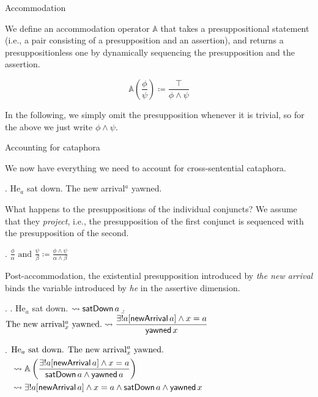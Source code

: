 \documentclass{beamer}
\begin{document}
\begin{frame}{Accommodation}

  We define an accommodation operator \(\mathbb{A}\) that takes a presuppositional statement (i.e., a pair consisting of a presupposition and an assertion), and returns a presuppositionless one by dynamically sequencing the presupposition and the assertion.

  \[\mathbb{A}\left(\frac{\phi}{\psi}\right) \coloneq \displaystyle\frac{\top}{\phi \wedge \psi}\]

  In the following, we simply omit the presupposition whenever it is trivial, so for the above we just write \(\phi \wedge \psi\).

\end{frame}

\begin{frame}[allowframebreaks]{Accounting for cataphora}

  We now have everything we need to account for cross-sentential cataphora.

  \ex. He\(_{a}\) sat down. The new arrival\(^{a}\) yawned.

 What happens to the presuppositions of the individual conjuncts? We assume that they \textit{project}, i.e., the presupposition of the first conjunct is sequenced with the presupposition of the second.

 \ex. \(\displaystyle\frac{\phi}{\alpha}\text{ and }\frac{\psi}{\beta} \coloneq \frac{\phi \wedge \psi}{\alpha \wedge \beta}\)

 \framebreak

 Post-accommodation, the existential presupposition introduced by \textit{the new arrival} binds the variable introduced by \textit{he} in the assertive dimension.

 \exi.
 \a. He\(_{a}\) sat down. $\rightsquigarrow \textsf{satDown}\,a$
 \b. $\text{The new arrival\(^{a}_{x}\) yawned.}\rightsquigarrow\displaystyle\frac{\exists !a[\textsf{newArrival}\,a] \wedge x = a}{\textsf{yawned}\,x}$

\ex. $\begin{aligned}[t]
  &\text{He\(_{a}\) sat down. The new arrival\(^{a}_{x}\) yawned.}\\ &\rightsquigarrow\mathbb{A}\left(\displaystyle\frac{\exists ! a[\textsf{newArrival}\,a] \wedge x = a}{\textsf{satDown}\,a \wedge \textsf{yawned}\,a}\right)\\
&\rightsquigarrow \exists ! a[\textsf{newArrival}\,a] \wedge x =a \wedge \textsf{satDown}\,a \wedge \textsf{yawned}\,x\end{aligned}$

\end{frame}
\end{document}
